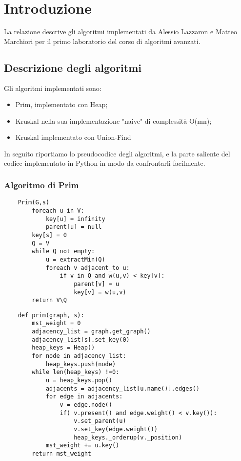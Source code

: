 \chapter{Introduzione\label{sec:introduzione}}
\noindent La relazione descrive gli algoritmi implementati da Alessio Lazzaron e Matteo Marchiori per il primo laboratorio del corso di algoritmi avanzati.

\section{Descrizione degli algoritmi\label{sec:descrizione}}
Gli algoritmi implementati sono:
\begin{itemize}
    \item Prim, implementato con Heap;
    \item Kruskal nella sua implementazione "naive" di complessità O(mn);
    \item Kruskal implementato con Union-Find
\end{itemize}

In seguito riportiamo lo pseudocodice degli algoritmi, e la parte saliente del codice implementato in Python in modo da confrontarli facilmente.

\clearpage

\subsection{Algoritmo di Prim\label{sec:prim}}
\begin{verbatim}
    Prim(G,s)
        foreach u in V:
            key[u] = infinity
            parent[u] = null
        key[s] = 0
        Q = V
        while Q not empty:
            u = extractMin(Q)
            foreach v adjacent_to u:
                if v in Q and w(u,v) < key[v]:
                    parent[v] = u
                    key[v] = w(u,v)
        return V\Q
\end{verbatim}

\begin{verbatim}
    def prim(graph, s):
        mst_weight = 0
        adjacency_list = graph.get_graph()
        adjacency_list[s].set_key(0)
        heap_keys = Heap()
        for node in adjacency_list:
            heap_keys.push(node)
        while len(heap_keys) !=0:
            u = heap_keys.pop()
            adjacents = adjacency_list[u.name()].edges()
            for edge in adjacents:
                v = edge.node()
                if( v.present() and edge.weight() < v.key()):
                    v.set_parent(u)
                    v.set_key(edge.weight())
                    heap_keys._orderup(v._position)
            mst_weight += u.key()
        return mst_weight
\end{verbatim}


